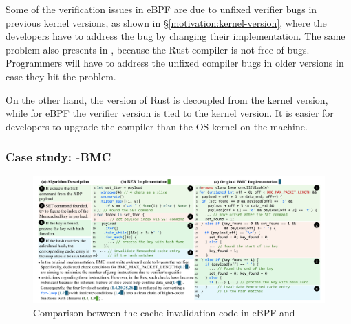 
Some of the verification issues in eBPF are due to unfixed verifier bugs in
    previous kernel versions, as shown in \S\ref{motivation:kernel-version},
    where the developers have to address the bug by changing their
    implementation.
The same problem also presents in \projname{}, because the Rust compiler is not
    free of bugs.
Programmers will have to address the unfixed compiler bugs in older versions
    in case they hit the problem.

On the other hand, the version of Rust is decoupled from the kernel version, while
    for eBPF the verifier version is tied to the kernel version.
It is easier for developers to upgrade the compiler than the OS kernel on the
    machine.


\subsubsection{Case study: \projname{}-BMC}
\label{eval:bmc-case-study}

\begin{figure}[t]
    \includegraphics[width=0.95\linewidth]{figs/rusty-bmc.pdf}
    \centering
    \vspace{-10pt}
    \caption{Comparison between the cache invalidation code in eBPF
        and \projname{}}
    \vspace{-10pt}
    \label{fig:rust-code}
\end{figure}

